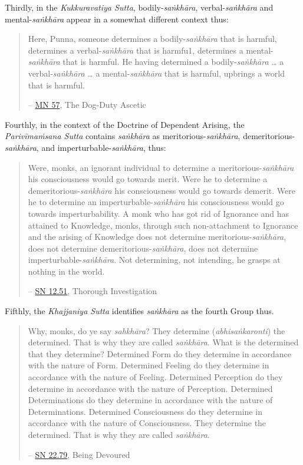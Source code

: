 Thirdly, in the \textit{Kukkuravatiya Sutta}, bodily-\textit{saṅkhāra}, verbal-\textit{saṅkhāra} and mental-\textit{saṅkhāra} appear in a somewhat different context thus:

\begin{quote}
Here, Punna, someone determines a bodily-\textit{saṅkhāra} that is harmful, determines a verbal-\textit{saṅkhāra} that is harmfu1, determines a mental-\textit{saṅkhāra} that is harmful. He having determined a bodily-\textit{saṅkhāra} \ldots{} a verbal-\textit{saṅkhāra} \ldots{} a mental-\textit{saṅkhāra} that is harmful, upbrings a world that is harmful.

 -- \href{https://suttacentral.net/mn57/en/bodhi}{MN 57}, The Dog-Duty Ascetic
\end{quote}

Fourthly, in the context of the Doctrine of Dependent Arising, the \textit{Parivīmaṁsana Sutta} contains \textit{saṅkhāra} as meritorious-\textit{saṅkhāra}, demeritorious-\textit{saṅkhāra}, and imperturbable-\textit{saṅkhāra}, thus:

\begin{quote}
Were, monks, an ignorant individual to determine a meritorious-\textit{saṅkhāra} his consciousness would go towards merit. Were he to determine a demeritorious-\textit{saṅkhāra} his consciousness would go towards demerit. Were he to determine an imperturbable-\textit{saṅkhāra} his consciousness would go towards imperturbability. A monk who has got rid of Ignorance and has attained to Knowledge, monks, through such non-attachment to Ignorance and the arising of Knowledge does not determine meritorious-\textit{saṅkhāra}, does not determine demeritorious-\textit{saṅkhāra}, does not determine imperturbable-\textit{saṅkhāra}. Not determining, not intending, he grasps at nothing in the world.

 -- \href{https://suttacentral.net/sn12.51/en/sujato}{SN 12.51}, Thorough Investigation
\end{quote}

Fifthly, the \textit{Khajjaniya Sutta} identifies \textit{saṅkhāra} as the fourth Group thus.

\begin{quote}
Why, monks, do ye say \textit{sahkhāra}? They determine (\textit{abhisaṅkaronti}) the determined. That is why they are called \textit{saṅkhāra}. What is the determined that they determine? Determined Form do they determine in accordance with the nature of Form. Determined Feeling do they determine in accordance with the nature of Feeling. Determined Perception do they determine in accordance with the nature of Perception. Determined Determinations do they determine in accordance with the nature of Determinations. Determined Consciousness do they determine in accordance with the nature of Consciousness. They determine the determined. That is why they are called \textit{saṅkhāra}.

 -- \href{https://suttacentral.net/sn22.79/en/bodhi}{SN 22.79}, Being Devoured
\end{quote}


